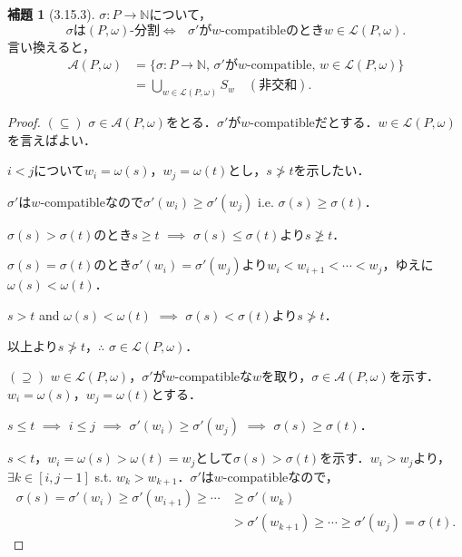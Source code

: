 \documentclass[xelatex,ja=standard,a4paper,14pt,everyparhook=compat]{bxjsarticle}
\newcommand{\bbN}{\mathbb{N}}
\newcommand{\mcA}{\mathcal{A}}
\newcommand{\mcL}{\mathcal{L}}
\theoremstyle{definition}
\newtheorem*{lemma}{補題}
\begin{document}
\begin{lemma}[3.15.3]
    $\sigma : P \to \bbN$について， \begin{equation*}
        \text{$\sigma$は$(P,\omega)$-分割$\iff$ $\sigma'$が$w$-compatibleのとき$w \in \mcL(P,\omega)$.}
    \end{equation*}
    言い換えると， \begin{align*}
        \mcA(P,\omega) & = \{\sigma : \text{$P \to \bbN$, $\sigma'$が$w$-compatible, $w \in \mcL(P,\omega)$}\} \\
                       & =\bigcup_{w \in \mcL(P,\omega)} S_w \quad (\text{非交和}).
    \end{align*}
\end{lemma}
\begin{proof}
    $(\subseteq)$ $\sigma \in \mcA(P,\omega)$をとる．$\sigma'$が$w$-compatibleだとする．$w \in \mcL(P,\omega)$を言えばよい．

    $i < j$について$w_i = \omega(s)$，$w_j = \omega(t)$とし，$s \not> t$を示したい．

    $\sigma'$は$w$-compatibleなので$\sigma'(w_i) \geq \sigma'(w_j)$ i.e. $\sigma(s) \geq \sigma(t)$．

    $\sigma(s) > \sigma(t)$のとき$s \geq t$ $\implies$ $\sigma(s) \leq \sigma(t)$より$s \not\geq t$．

    $\sigma(s) = \sigma(t)$のとき$\sigma'(w_i) = \sigma'(w_j)$より$w_i < w_{i+1} < \cdots < w_j$，ゆえに$\omega(s) < \omega(t)$．

    $s > t$ and $\omega(s) < \omega(t)$ $\implies$ $\sigma(s) < \sigma(t)$より$s \not> t$．

    以上より$s \not> t$，$\therefore$ $\sigma \in \mcL(P,\omega)$．

    $(\supseteq)$ $w \in \mcL(P,\omega)$，$\sigma'$が$w$-compatibleな$w$を取り，$\sigma \in \mcA(P,\omega)$を示す．$w_i = \omega(s)$，$w_j = \omega(t)$とする．

    $s \leq t$ $\implies$ $i \leq j$ $\implies$ $\sigma'(w_i) \geq \sigma'(w_j)$ $\implies$ $\sigma(s) \geq \sigma(t)$．

    $s < t$，$w_i = \omega(s) > \omega(t) = w_j$として$\sigma(s) > \sigma(t)$を示す．$w_i > w_j$より，$\exists k \in [i, j-1]$ s.t. $w_k > w_{k+1}$．$\sigma'$は$w$-compatibleなので， \begin{align*}
        \sigma(s) = \sigma'(w_i) \geq \sigma'(w_{i+1}) \geq \cdots &\geq \sigma'(w_k) \\
        &> \sigma'(w_{k+1}) \geq \cdots \geq \sigma'(w_j) = \sigma(t).
    \end{align*}
\end{proof}
\end{document}
